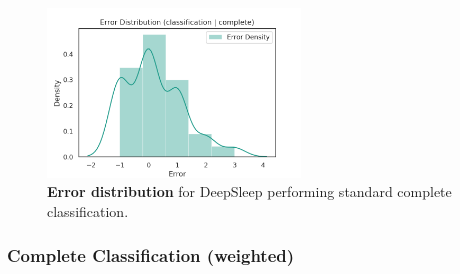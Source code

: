 \documentclass[11pt]{scrartcl}
\begin{document}
\begin{figure}[hbt]
	\centering
	\includegraphics[width=0.6\textwidth,center]{img/learning/original_physionet_sleepnet_classification_complete_none_unweighted_error_distribution.png}
	\caption{\textcolor{viridis5}{\textbf{Error distribution}} for DeepSleep performing standard complete classification.}
	\label{fig:original_physionet_sleepnet_classification_complete_none_unweighted_error_distribution}
\end{figure}

\FloatBarrier




\FloatBarrier
\subsubsection{Complete Classification (weighted)}
\end{document}

